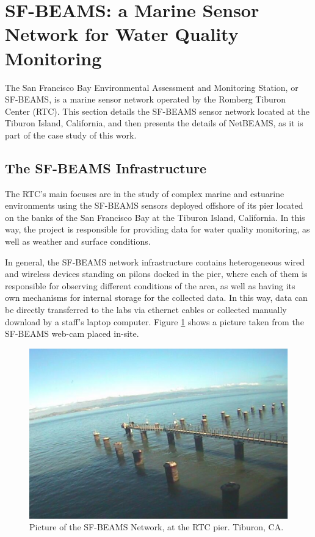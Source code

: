 \section{SF-BEAMS: a Marine Sensor Network for Water Quality Monitoring}

The San Francisco Bay Environmental Assessment and Monitoring Station,
or SF-BEAMS, is a marine sensor network operated by the Romberg Tiburon Center
(RTC). This section details the SF-BEAMS sensor network located at
the Tiburon Island, California, and then presents the details of NetBEAMS, as
it is part of the case study of this work.

\subsection{The SF-BEAMS Infrastructure}

The RTC's main focuses are in the study of complex marine and estuarine
environments using the SF-BEAMS sensors deployed offshore of its pier located
on the banks of the San Francisco Bay at the Tiburon Island, California. In
this way, the project is responsible for providing data for water quality
monitoring, as well as weather and surface conditions. 

In general, the SF-BEAMS network infrastructure contains heterogeneous wired and
wireless devices standing on pilons docked in the pier, where each of them is
responsible for observing different conditions of the area, as well as having
its own mechanisms for internal storage for the collected data. In this way,
data can be directly transferred to the labs via ethernet cables or collected
manually download by a staff's laptop computer. Figure \ref{fig:sf-beams}
shows a picture taken from the SF-BEAMS web-cam placed in-site.

\begin{figure}
  \centering
    \includegraphics{../diagrams/cam_image-oct15}
  \caption{Picture of the SF-BEAMS Network, at the RTC pier. Tiburon, CA.}
  \label{fig:sf-beams}
\end{figure}

